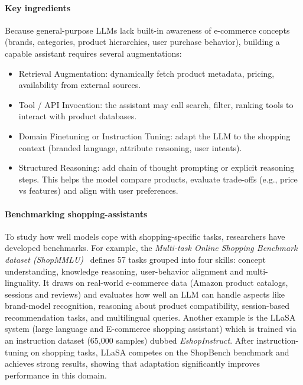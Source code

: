 \paragraph{Key ingredients}
Because general-purpose LLMs lack built-in awareness of e-commerce concepts (brands, categories, product hierarchies, user purchase behavior), building a capable assistant requires several augmentations:
\begin{itemize}
  \item Retrieval Augmentation: dynamically fetch product metadata, pricing, availability from external sources.
  \item Tool / API Invocation: the assistant may call search, filter, ranking tools to interact with product databases.
  \item Domain Finetuning or Instruction Tuning: adapt the LLM to the shopping context (branded language, attribute reasoning, user intents).
  \item Structured Reasoning: add chain of thought prompting or explicit reasoning steps. This helps the model compare products, evaluate trade-offs (e.g., price vs features) and align with user preferences.
\end{itemize}

\paragraph{Benchmarking shopping-assistants}
To study how well models cope with shopping-specific tasks, researchers have developed benchmarks. For example, the \emph{Multi-task Online Shopping Benchmark dataset (ShopMMLU)}~\citep{jin2024shopping}  defines 57 tasks grouped into four skills: concept understanding, knowledge reasoning, user-behavior alignment and multi-linguality. It draws on real-world e-commerce data (Amazon product catalogs, sessions and reviews) and evaluates how well an LLM can handle aspects like brand-model recognition, reasoning about product compatibility, session-based recommendation tasks, and multilingual queries.
Another example is the LLaSA system (large language and E-commerce shopping assistant) \citep{zhang2024llasa} which is trained via an instruction dataset (65,000 samples) dubbed {\em EshopInstruct}. After instruction-tuning on shopping tasks, LLaSA competes on the ShopBench benchmark and achieves strong results, showing that adaptation significantly improves performance in this domain. 

